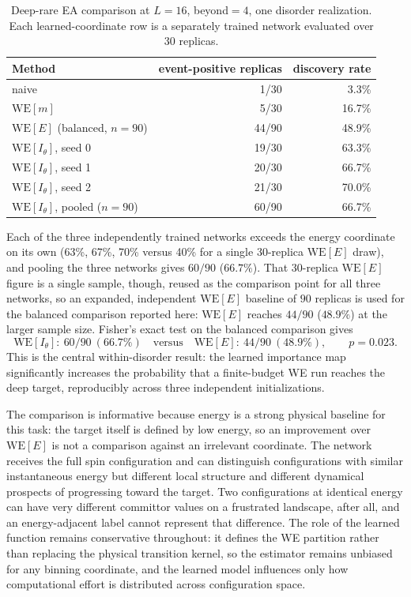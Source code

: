 \documentclass[a4paper,fleqn]{cas-sc}
\newcommand{\WE}{\mathrm{WE}}
\begin{document}
\begin{table}[H]
\centering\small
\caption{Deep-rare EA comparison at $L=16$, beyond$=4$, one disorder realization. Each
learned-coordinate row is a separately trained network evaluated over 30 replicas.}
\label{tab:deep}
\begin{tabular}{lrr}
\toprule
Method & event-positive replicas & discovery rate \\
\midrule
naive & 1/30 & 3.3\% \\
$\WE[m]$ & 5/30 & 16.7\% \\
$\WE[E]$ (balanced, $n=90$) & 44/90 & 48.9\% \\
$\WE[I_\theta]$, seed 0 & 19/30 & 63.3\% \\
$\WE[I_\theta]$, seed 1 & 20/30 & 66.7\% \\
$\WE[I_\theta]$, seed 2 & 21/30 & 70.0\% \\
$\WE[I_\theta]$, pooled ($n=90$) & 60/90 & 66.7\% \\
\bottomrule
\end{tabular}
\end{table}

Each of the three independently trained networks exceeds the energy coordinate on its own
(63\%, 67\%, 70\% versus 40\% for a single 30-replica $\WE[E]$ draw), and pooling the three
networks gives $60/90$ ($66.7\%$). That $30$-replica $\WE[E]$ figure is a single sample,
though, reused as the comparison point for all three networks, so an expanded, independent
$\WE[E]$ baseline of $90$ replicas is used for the balanced comparison reported here: $\WE[E]$
reaches $44/90$ ($48.9\%$) at the larger sample size. Fisher's exact test on the balanced
comparison gives
\begin{equation}
\WE[I_\theta]:\ 60/90\ (66.7\%)\quad\text{versus}\quad\WE[E]:\ 44/90\ (48.9\%),\qquad p=0.023.
\label{eq:withinp}
\end{equation}
This is the central within-disorder result: the learned importance map significantly increases
the probability that a finite-budget WE run reaches the deep target, reproducibly across three
independent initializations.

The comparison is informative because energy is a strong physical baseline for this task: the
target itself is defined by low energy, so an improvement over $\WE[E]$ is not a comparison
against an irrelevant coordinate. The network receives the full spin configuration and can
distinguish configurations with similar instantaneous energy but different local structure and
different dynamical prospects of progressing toward the target. Two configurations at
identical energy can have very different committor values on a frustrated landscape, after
all, and an energy-adjacent label cannot represent that difference. The role of the learned
function remains conservative throughout: it defines the WE partition rather than replacing
the physical transition kernel, so the estimator remains unbiased for any binning coordinate,
and the learned model influences only how computational effort is distributed across
configuration space.
\end{document}
